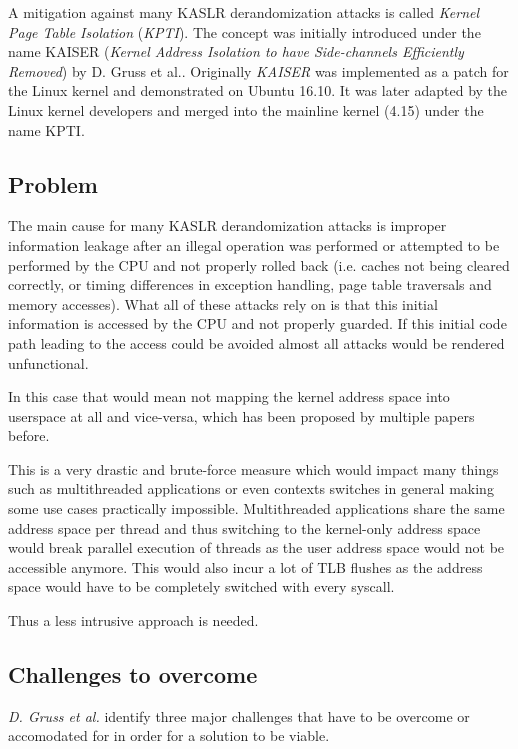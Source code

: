 A mitigation against many KASLR derandomization attacks is called \textit{Kernel Page Table Isolation} (\textit{KPTI}).
The concept was initially introduced under the name KAISER (\textit{Kernel Address Isolation to have Side-channels Efficiently Removed}) by D. Gruss et al.\cite{kaiser}.
Originally \textit{KAISER} was implemented as a patch for the Linux kernel and demonstrated on Ubuntu 16.10.
It was later adapted by the Linux kernel developers and merged into the mainline kernel (4.15) under the name KPTI.\cite{kpti_lwn}

\subsection{Problem}

The main cause for many KASLR derandomization attacks is improper information leakage after an illegal operation was performed or attempted to be performed by the CPU and not properly rolled back (i.e. caches not being cleared correctly, or timing differences in exception handling, page table traversals and memory accesses).
What all of these attacks rely on is that this initial information is accessed by the CPU and not properly guarded.
If this initial code path leading to the access could be avoided almost all attacks would be rendered unfunctional. \cite{kaiser}

In this case that would mean not mapping the kernel address space into userspace at all and vice-versa, which has been proposed by multiple papers before\cite{drk, prefetch-side-channel-smap}.

This is a very drastic and brute-force measure which would impact many things such as multithreaded applications or even contexts switches in general making some use cases practically impossible.
Multithreaded applications share the same address space per thread and thus switching to the kernel-only address space would break parallel execution of threads as the user address space would not be accessible anymore.
This would also incur a lot of TLB flushes as the address space would have to be completely switched with every syscall.\cite{kaiser}

Thus a less intrusive approach is needed.

\subsection{Challenges to overcome}

\textit{D. Gruss et al.} \cite{kaiser} identify three major challenges that have to be overcome or accomodated for in order for a solution to be viable.

